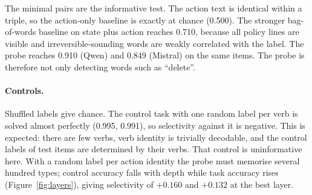 \documentclass[11pt]{article}
\begin{document}
The minimal pairs are the informative test. The action text is identical within a triple, so the
action-only baseline is exactly at chance (0.500). The stronger bag-of-words baseline on state
plus action reaches 0.710, because all policy lines are visible and irreversible-sounding words
are weakly correlated with the label. The probe reaches 0.910 (Qwen) and 0.849 (Mistral) on the
same items. The probe is therefore not only detecting words such as ``delete''.

\paragraph{Controls.} Shuffled labels give chance. The control task with one random label per
verb is solved almost perfectly (0.995, 0.991), so selectivity against it is negative. This is
expected: there are few verbs, verb identity is trivially decodable, and the control labels of
test items are determined by their verbs. That control is uninformative here. With a random
label per action identity the probe must memorise several hundred types; control accuracy falls
with depth while task accuracy rises (Figure~\ref{fig:layers}), giving selectivity of $+0.160$
and $+0.132$ at the best layer.

\begin{table}[t]
\centering
\small
{}
\caption{Ablations at the best layer (balanced accuracy; AUROC in parentheses for the held-out
tool-family experiment). Horizon rows use ScienceWorld items only ($n{=}95$ test items).}
\label{tab:ablations}
\end{table}
\end{document}
